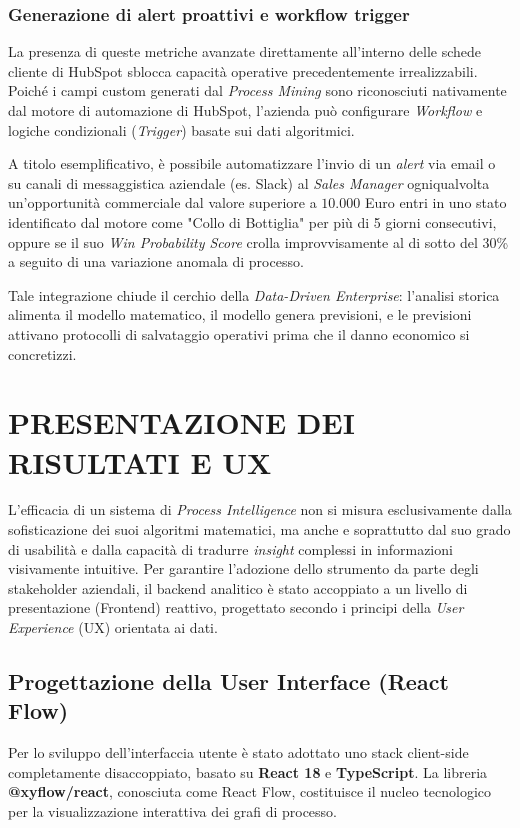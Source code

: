 \documentclass[12pt, a4paper]{report}
\begin{document}
\subsection{Generazione di alert proattivi e workflow trigger}
La presenza di queste metriche avanzate direttamente all'interno delle schede cliente di HubSpot sblocca capacità operative precedentemente irrealizzabili. Poiché i campi custom generati dal \textit{Process Mining} sono riconosciuti nativamente dal motore di automazione di HubSpot, l'azienda può configurare \textit{Workflow} e logiche condizionali (\textit{Trigger}) basate sui dati algoritmici.

A titolo esemplificativo, è possibile automatizzare l'invio di un \textit{alert} via email o su canali di messaggistica aziendale (es. Slack) al \textit{Sales Manager} ogniqualvolta un'opportunità commerciale dal valore superiore a $10.000$ Euro entri in uno stato identificato dal motore come "Collo di Bottiglia" per più di 5 giorni consecutivi, oppure se il suo \textit{Win Probability Score} crolla improvvisamente al di sotto del 30\% a seguito di una variazione anomala di processo. 

Tale integrazione chiude il cerchio della \textit{Data-Driven Enterprise}: l'analisi storica alimenta il modello matematico, il modello genera previsioni, e le previsioni attivano protocolli di salvataggio operativi prima che il danno economico si concretizzi.

\chapter{PRESENTAZIONE DEI RISULTATI E UX}

L'efficacia di un sistema di \textit{Process Intelligence} non si misura esclusivamente dalla sofisticazione dei suoi algoritmi matematici, ma anche e soprattutto dal suo grado di usabilità e dalla capacità di tradurre \textit{insight} complessi in informazioni visivamente intuitive. Per garantire l'adozione dello strumento da parte degli stakeholder aziendali, il backend analitico è stato accoppiato a un livello di presentazione (Frontend) reattivo, progettato secondo i principi della \textit{User Experience} (UX) orientata ai dati.

\section{Progettazione della User Interface (React Flow)}
Per lo sviluppo dell'interfaccia utente è stato adottato uno stack client-side completamente disaccoppiato, basato su \textbf{React 18} e \textbf{TypeScript}. La libreria \textbf{@xyflow/react}, conosciuta come React Flow, costituisce il nucleo tecnologico per la visualizzazione interattiva dei grafi di processo.
\end{document}
